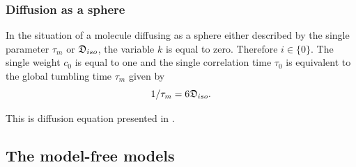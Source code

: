 \begin{htmlonly}
\begin{htmlonly}
\subsubsection{Diffusion as a sphere}

In the situation of a molecule diffusing as a sphere either described by the single parameter $\tau_m$ or $\mathfrak{D}_{iso}$, the variable $k$ is equal to zero.
Therefore $i \in \{0\}$.
The single weight $c_0$ is equal to one and the single correlation time $\tau_0$ is equivalent to the global tumbling time $\tau_m$ given by
\begin{equation} \label{eq: sphere tau0}
    1/\tau_m = 6\mathfrak{D}_{iso}.
\end{equation}

\noindent This is diffusion equation presented in \citet{Bloembergen48}.



\subsection{The model-free models}


\end{htmlonly}
\end{htmlonly}
